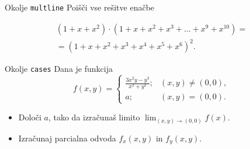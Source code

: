 \begin{frame}{Okolje \texttt{multline}}
	Poišči vse rešitve enačbe
			
		\begin{multline*}
			(1+x+x^2) \cdot (1+x+x^2+x^3+\ldots+x^9+x^{10}) = \\
			=(1+x+x^2+x^3+x^4+x^5+x^6)^2.
		\end{multline*}
\end{frame}

\begin{frame}{Okolje \texttt{cases}}
	Dana je funkcija
	\[
		f(x,y) = 
		\begin{cases}
			\frac{3x^2y-y^3}{x^2+y^2}; & (x, y) \neq (0, 0), \\
			a; 		                   & (x, y) = (0, 0).
		\end{cases}
		\]
	\begin{itemize}
	\item Določi $a$, tako da izračunaš limito \( \lim_{(x,y)\to(0,0)} f(x). \)
	\item Izračunaj parcialna odvoda $f_x(x,y)$ in $f_y(x,y)$.
	\end{itemize}
\end{frame}
